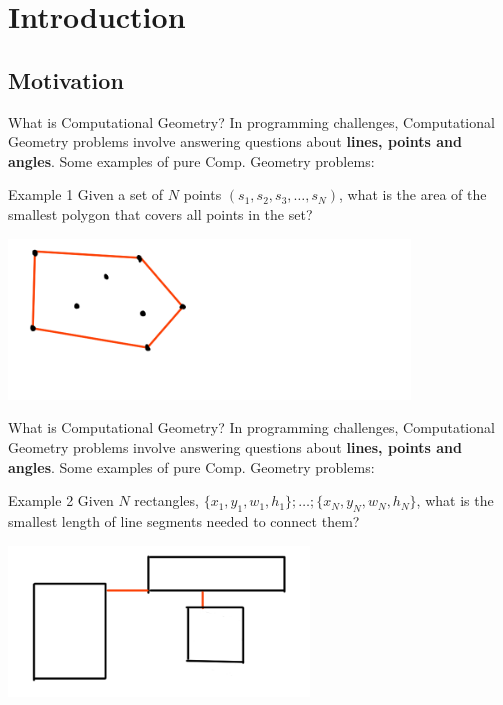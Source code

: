 
\section{Introduction}

\subsection{Motivation}
\begin{frame}[t]{What is Computational Geometry?}
  In programming challenges, Computational Geometry problems involve answering questions about {\bf lines, points and angles}. Some examples of pure Comp. Geometry problems:

  \begin{block}{Example 1}
    Given a set of $N$ points $(s_1, s_2, s_3, \ldots, s_N)$, what is
    the area of the smallest polygon that covers all points in the set?
  \end{block}

  \centering
  \includegraphics[width=0.8\textwidth]{img/sampleproblem_1.png}
\end{frame}

\begin{frame}[t]{What is Computational Geometry?}
  In programming challenges, Computational Geometry problems involve answering questions about {\bf lines, points and angles}. Some examples of pure Comp. Geometry problems:

  \begin{block}{Example 2}
    Given $N$ rectangles, $\{x_1,y_1,w_1,h_1\}; \ldots; \{x_N, y_N, w_N, h_N\}$, what is the smallest length of line segments needed to connect them?
  \end{block}

  \centering
  \includegraphics[width=0.6\textwidth]{img/sampleproblem_2.png}
\end{frame}

